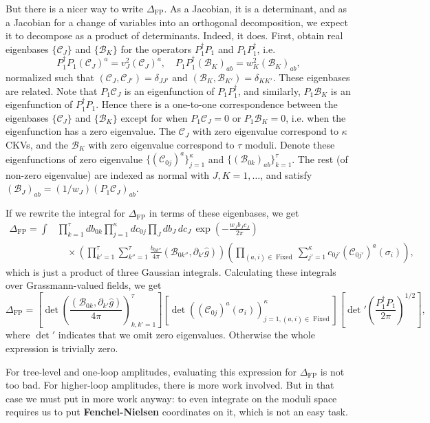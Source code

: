 \documentclass{report}
\theoremstyle{plain}
\theoremstyle{definition}
\theoremstyle{remark}
\newcommand{\di}{\partial}
\newcommand{\cB}{\mathcal{B}}
\newcommand{\cC}{\mathcal{C}}
\DeclareMathOperator{\Fixed}{Fixed}
\begin{document}
But there is a nicer way to write $\Delta_{\text{FP}}$. As a Jacobian,
it is a determinant, and as a Jacobian for a change of variables into
an orthogonal decomposition, we expect it to decompose as a product of
determinants. Indeed, it does. First, obtain real eigenbases
$\{\cC_J\}$ and $\{\cB_K\}$ for the operators $P_1^\dag P_1$ and $P_1
P_1^\dag$, i.e.
\[ P_1^\dag P_1 (\cC_J)^a = v_J^2 (\cC_J)^a, \quad P_1 P_1^\dag (\cB_K)_{ab} = w_K^2 (\cB_K)_{ab}, \]
normalized such that $(\cC_J, \cC_{J'}) = \delta_{JJ'}$ and $(\cB_K,
\cB_{K'}) = \delta_{KK'}$. These eigenbases are related. Note that
$P_1\cC_J$ is an eigenfunction of $P_1P_1^\dag$, and similarly,
$P_1\cB_K$ is an eigenfunction of $P_1^\dag P_1$. Hence there is a
one-to-one correspondence between the eigenbases $\{\cC_J\}$ and
$\{\cB_K\}$ except for when $P_1\cC_J = 0$ or $P_1\cB_K = 0$, i.e.
when the eigenfunction has a zero eigenvalue. The $\cC_J$ with zero
eigenvalue correspond to $\kappa$ CKVs, and the $\cB_K$ with zero
eigenvalue correspond to $\tau$ moduli. Denote these eigenfunctions of
zero eigenvalue $\{(\cC_{0j})^a\}_{j=1}^\kappa$ and
$\{(\cB_{0k})_{ab}\}_{k=1}^\tau$. The rest (of non-zero eigenvalue)
are indexed as normal with $J, K = 1, \ldots$, and satisfy
$(\cB_J)_{ab} = (1/w_J)(P_1 \cC_J)_{ab}$.

If we rewrite the integral for $\Delta_{\text{FP}}$ in terms of these
eigenbases, we get
\begin{align*}
  \Delta_{\text{FP}} = \int &\prod_{k=1}^\tau db_{0k} \prod_{j=1}^\kappa dc_{0j} \prod_J db_J \, dc_J \, \exp\left(-\frac{w_J b_J c_J}{2\pi}\right) \\
  &\quad \times \left(\prod_{k'=1}^\tau \sum_{k''=1}^\tau \frac{b_{0k''}}{4\pi} (\cB_{0k''}, \di_{k'}\hat{g})\right) \left(\prod_{(a,i) \in \Fixed} \sum_{j'=1}^\kappa c_{0j'} (\cC_{0j'})^a(\sigma_i)\right),
\end{align*}
which is just a product of three Gaussian integrals. Calculating these
integrals over Grassmann-valued fields, we get
\[ \Delta_{\text{FP}} = \left[\det\left(\frac{(\cB_{0k}, \di_{k'}\hat{g})}{4\pi}\right)_{k,k'=1}^\tau\right]\left[\det\left((\cC_{0j})^a(\sigma_i)\right)_{j=1, (a,i) \in \Fixed}^\kappa\right] \left[\det\nolimits' \left(\frac{P_1^\dag P_1}{2\pi}\right)^{1/2}\right], \]
where $\det'$ indicates that we omit zero eigenvalues. Otherwise the
whole expression is trivially zero.

For tree-level and one-loop amplitudes, evaluating this expression for
$\Delta_{\text{FP}}$ is not too bad. For higher-loop amplitudes, there
is more work involved. But in that case we must put in more work
anyway: to even integrate on the moduli space requires us to put {\bf
  Fenchel-Nielsen} coordinates on it, which is not an easy task.
\end{document}
